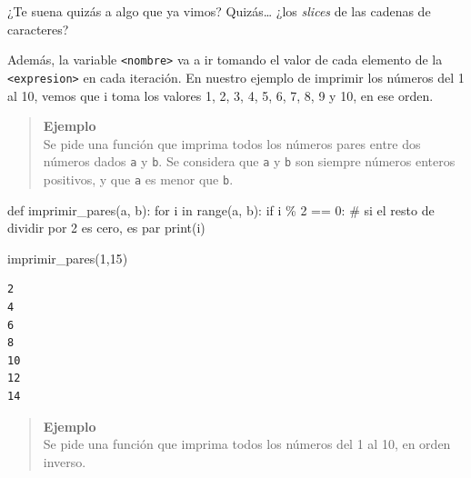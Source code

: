 \documentclass[
  letterpaper,
  DIV=11,
  numbers=noendperiod]{scrreprt}
\newenvironment{Shaded}{\begin{snugshade}}{\end{snugshade}}
\newcommand{\BuiltInTok}[1]{\textcolor[rgb]{0.00,0.23,0.31}{#1}}
\newcommand{\CommentTok}[1]{\textcolor[rgb]{0.37,0.37,0.37}{#1}}
\newcommand{\ControlFlowTok}[1]{\textcolor[rgb]{0.00,0.23,0.31}{#1}}
\newcommand{\DecValTok}[1]{\textcolor[rgb]{0.68,0.00,0.00}{#1}}
\newcommand{\KeywordTok}[1]{\textcolor[rgb]{0.00,0.23,0.31}{#1}}
\newcommand{\NormalTok}[1]{\textcolor[rgb]{0.00,0.23,0.31}{#1}}
\newcommand{\OperatorTok}[1]{\textcolor[rgb]{0.37,0.37,0.37}{#1}}
\begin{document}
\begin{tcolorbox}[enhanced jigsaw, colframe=quarto-callout-note-color-frame, opacityback=0, opacitybacktitle=0.6, bottomrule=.15mm, toprule=.15mm, coltitle=black, breakable, colback=white, leftrule=.75mm, titlerule=0mm, bottomtitle=1mm, toptitle=1mm, rightrule=.15mm, title=\textcolor{quarto-callout-note-color}{\faInfo}\hspace{0.5em}{Note}, arc=.35mm, left=2mm, colbacktitle=quarto-callout-note-color!10!white]

¿Te suena quizás a algo que ya vimos? Quizás\ldots{} ¿los \emph{slices}
de las cadenas de caracteres?

\end{tcolorbox}

Además, la variable \texttt{\textless{}nombre\textgreater{}} va a ir
tomando el valor de cada elemento de la
\texttt{\textless{}expresion\textgreater{}} en cada iteración. En
nuestro ejemplo de imprimir los números del 1 al 10, vemos que i toma
los valores 1, 2, 3, 4, 5, 6, 7, 8, 9 y 10, en ese orden.\\

\begin{quote}
\textbf{Ejemplo}\\
Se pide una función que imprima todos los números pares entre dos
números dados \texttt{a} y \texttt{b}. Se considera que \texttt{a} y
\texttt{b} son siempre números enteros positivos, y que \texttt{a} es
menor que \texttt{b}.
\end{quote}

\begin{Shaded}
\begin{Highlighting}[]
\KeywordTok{def}\NormalTok{ imprimir\_pares(a, b):}
  \ControlFlowTok{for}\NormalTok{ i }\KeywordTok{in} \BuiltInTok{range}\NormalTok{(a, b):}
    \ControlFlowTok{if}\NormalTok{ i }\OperatorTok{\%} \DecValTok{2} \OperatorTok{==} \DecValTok{0}\NormalTok{: }\CommentTok{\# si el resto de dividir por 2 es cero, es par}
      \BuiltInTok{print}\NormalTok{(i)}

\NormalTok{imprimir\_pares(}\DecValTok{1}\NormalTok{,}\DecValTok{15}\NormalTok{)}
\end{Highlighting}
\end{Shaded}

\begin{verbatim}
2
4
6
8
10
12
14
\end{verbatim}

\hfill\break

\begin{quote}
\textbf{Ejemplo}\\
Se pide una función que imprima todos los números del 1 al 10, en orden
inverso.
\end{quote}
\end{document}
